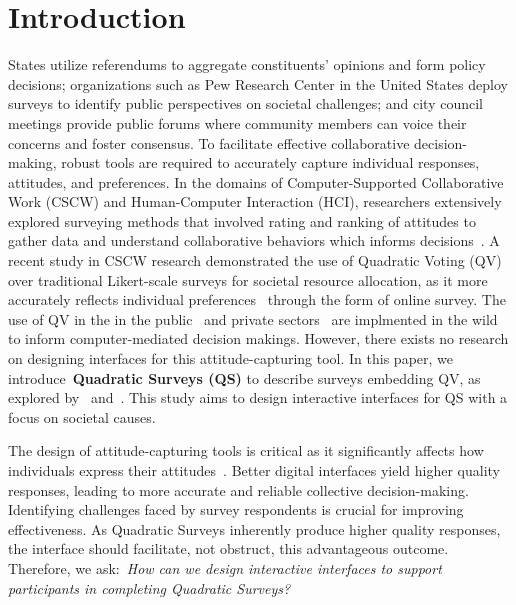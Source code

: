 \section{Introduction}
States utilize referendums to aggregate constituents' opinions and form policy decisions; organizations such as Pew Research Center in the United States deploy surveys to identify public perspectives on societal challenges; and city council meetings provide public forums where community members can voice their concerns and foster consensus. To facilitate effective collaborative decision-making, robust tools are required to accurately capture individual responses, attitudes, and preferences. In the domains of Computer-Supported Collaborative Work (CSCW) and Human-Computer Interaction (HCI), researchers extensively explored surveying methods that involved rating and ranking of attitudes to gather data and understand collaborative behaviors which informs decisions~\cite{haynesSituatingEvaluationScenarios2004, resnickGroupLensOpenArchitecture1994, pooleConflictManagementGroup1988}. A recent study in CSCW research demonstrated the use of Quadratic Voting (QV) over traditional Likert-scale surveys for societal resource allocation, as it more accurately reflects individual preferences~\cite{chengCanShowWhat2021} through the form of online survey. The use of QV in the in the public~\cite{rogersColoradoTriedNew2019, teamTaiwanDigitalMinister} and private sectors~\cite{Gov4gitDecentralizedPlatform2023} are implmented in the wild to inform computer-mediated decision makings. However, there exists no research on designing interfaces for this attitude-capturing tool. In this paper, we introduce~\textbf{Quadratic Surveys (QS)} to describe surveys embedding QV, as explored by~\textcite{quarfoot2017quadratic} and~\textcite{chengCanShowWhat2021}. This study aims to design interactive interfaces for QS with a focus on societal causes. 

The design of attitude-capturing tools is critical as it significantly affects how individuals express their attitudes~\cite{engstrom2020politics, weijtersEffectRatingScale2010, kierujVariationsResponseStyle2010, toepoelSmileysStarsHearts2019, farzandAestheticsEvaluatingResponse2024, xiaoTellMeYourself2020, pielotDidYouMisclick2024}. Better digital interfaces yield higher quality responses, leading to more accurate and reliable collective decision-making. Identifying challenges faced by survey respondents is crucial for improving effectiveness. As Quadratic Surveys inherently produce higher quality responses, the interface should facilitate, not obstruct, this advantageous outcome. Therefore, we ask:~\textit{How can we design interactive interfaces to support participants in completing Quadratic Surveys?}

